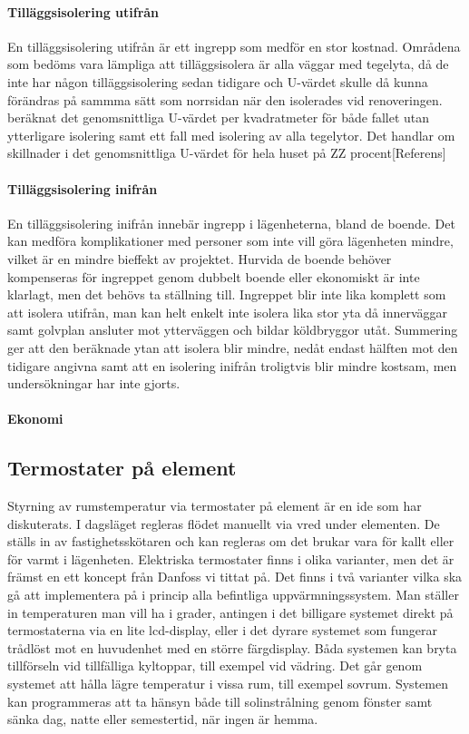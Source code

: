 \paragraph{Tilläggsisolering utifrån}
En tilläggsisolering utifrån är ett ingrepp som medför en stor kostnad. Områdena som bedöms vara lämpliga att tilläggsisolera är alla väggar med tegelyta, då de inte har någon tilläggsisolering sedan tidigare och U-värdet skulle då kunna förändras på sammma sätt som norrsidan när den isolerades vid renoveringen. beräknat det genomsnittliga U-värdet per kvadratmeter för både fallet utan ytterligare isolering samt ett fall med isolering av alla tegelytor. Det handlar om skillnader i det genomsnittliga U-värdet för hela huset på ZZ procent[Referens]

\paragraph{Tilläggsisolering inifrån}
En tilläggsisolering inifrån innebär ingrepp i lägenheterna, bland de boende. Det kan medföra komplikationer med personer som inte vill göra lägenheten mindre, vilket är en mindre bieffekt av projektet. Hurvida de boende behöver kompenseras för ingreppet genom dubbelt boende eller ekonomiskt är inte klarlagt, men det behövs ta ställning till. Ingreppet blir inte lika komplett som att isolera utifrån, man kan helt enkelt inte isolera lika stor yta då innerväggar samt golvplan ansluter mot ytterväggen och bildar köldbryggor utåt. Summering ger att den beräknade ytan att isolera blir mindre, nedåt endast hälften mot den tidigare angivna samt att en isolering inifrån troligtvis blir mindre kostsam, men undersökningar har inte gjorts.

\paragraph{Ekonomi}

\subsection{Termostater på element}
Styrning av rumstemperatur via termostater på element är en ide som har diskuterats. I dagsläget regleras flödet manuellt via vred under elementen. De ställs in av fastighetsskötaren och kan regleras om det brukar vara för kallt eller för varmt i lägenheten. 
Elektriska termostater finns i olika varianter, men det är främst en ett koncept från Danfoss vi tittat på. Det finns i två varianter vilka ska gå att implementera på i princip alla befintliga uppvärmningssystem. Man ställer in temperaturen man vill ha i grader, antingen i det billigare systemet direkt på termostaterna via en lite lcd-display, eller i det dyrare systemet som fungerar trådlöst mot en huvudenhet med en större färgdisplay.
Båda systemen kan bryta tillförseln vid tillfälliga kyltoppar, till exempel vid vädring. Det går genom systemet att hålla lägre temperatur i vissa rum, till exempel sovrum. Systemen kan programmeras att ta hänsyn både till solinstrålning genom fönster samt sänka dag, natte eller semestertid, när ingen är hemma.

